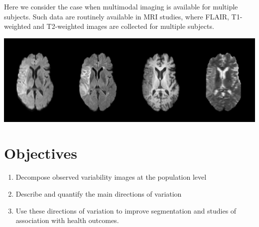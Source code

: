 \documentclass[a0,landscape]{a0poster}
\begin{document}
\begin{multicols}{3}
\noindent Here we consider the case when multimodal imaging is available for multiple subjects. Such data are routinely available in MRI studies, where FLAIR, T1-weighted and T2-weighted images are collected for multiple subjects.
\begin{center}\vspace{.5cm}
\includegraphics[width=1\linewidth]{image_ex.pdf}
\end{center}\vspace{.5cm}
\large{\section*{\color{uwred}Objectives}}
\begin{enumerate}
\item  Decompose observed variability images at the population level
\item Describe and quantify the main directions of variation
\item Use these directions of variation to improve segmentation and studies of association with health outcomes.
\end{enumerate}


\end{multicols}
\end{document}
